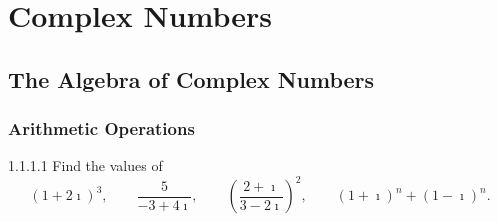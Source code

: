 \chapter{Complex Numbers}

\section{The Algebra of Complex Numbers}

\subsection{Arithmetic Operations}

\begin{problem}{1.1.1.1}
Find the values of
\[
	{(1 + 2\imath)}^{3}, \qquad \dfrac{5}{-3 + 4\imath}, \qquad {\left(\dfrac{2 + \imath}{3 - 2\imath}\right)}^{2}, \qquad {(1 + \imath)}^{n} + {(1 - \imath)}^{n}.
\]
\end{problem}

